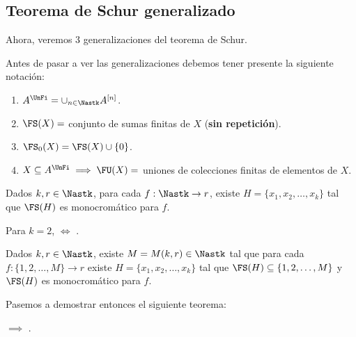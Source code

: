 \subsection{Teorema de Schur generalizado}

Ahora, veremos 3 generalizaciones del teorema de Schur.

\begin{notn}

    Antes de pasar a ver las generalizaciones debemos tener presente la siguiente notación:
    
    \begin{enumerate}
        \item $A^{\UnFi} = \cup_{n \in \Nastk} A^{[n]}$.
        \item $\FS(X) = $ conjunto de sumas finitas de $X$ (\textbf{sin repetición}).
        \item $\FS_0(X) = \FS(X) \cup \{0\}$.
        \item $X \subseteq A^{\UnFi} \implies \FU(X) = $ uniones de colecciones finitas de elementos de $X$.
    \end{enumerate}
\end{notn}

\begin{teo}\label{teo:GS}
    Dados $k, r \in \Nastk$, para cada $f: \Nastk \rightarrow r$, existe $H = \{x_1, x_2, \dots, x_k\}$ tal que $\FS(H)$ es monocromático para $f$.
\end{teo}

\begin{nota}
    Para $k = 2$, \GS $\iff$ \TS.
\end{nota}

\begin{teo}\label{teo:GSF}
    Dados $k, r \in \Nastk$, existe $M = M(k,r) \in \Nastk$ tal que para cada $f: \{1, 2, \dots, M\} \rightarrow r$ existe $H = \{x_1, x_2, \dots, x_k\}$ tal que $\FS(H) \subseteq \{1, 2, \dots, M\}$ y $\FS(H)$ es monocromático para $f$.
\end{teo}

Pasemos a demostrar entonces el siguiente teorema:

\begin{teo}
    \GS $\implies$ \GSF.
\end{teo}

